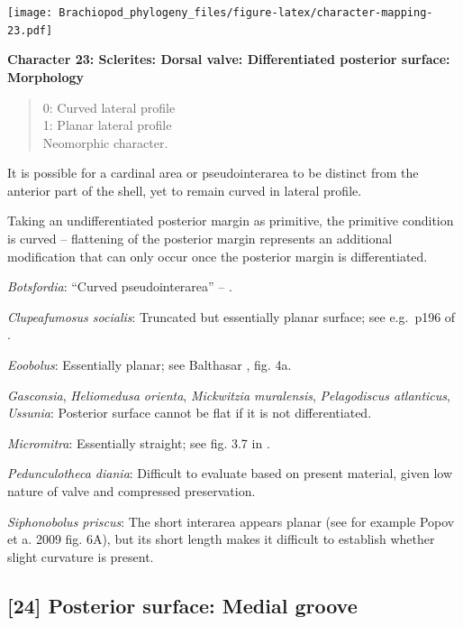 \documentclass[openany]{book}
\theoremstyle{definition}
\theoremstyle{definition}
\theoremstyle{definition}
\theoremstyle{remark}
\begin{document}
\texttt{[image: Brachiopod\_phylogeny\_files/figure-latex/character-mapping-23.pdf]}

\textbf{Character 23: Sclerites: Dorsal valve: Differentiated posterior
surface: Morphology}

\begin{quote}
0: Curved lateral profile\\
1: Planar lateral profile\\
Neomorphic character.
\end{quote}

It is possible for a cardinal area or pseudointerarea to be distinct
from the anterior part of the shell, yet to remain curved in lateral
profile.

Taking an undifferentiated posterior margin as primitive, the primitive
condition is curved -- flattening of the posterior margin represents an
additional modification that can only occur once the posterior margin is
differentiated.

\hypertarget{Botsfordia-coding-23}{}
\emph{Botsfordia}: ``Curved pseudointerarea'' --
\citet{Skovsted2017Depthrelated}.

\hypertarget{Clupeafumosus_socialis-coding-23}{}
\emph{Clupeafumosus socialis}: Truncated but essentially planar surface;
see e.g.~p196 of \citet{Topper2013Reappraisalof}.

\hypertarget{Eoobolus-coding-23}{}
\emph{Eoobolus}: Essentially planar; see Balthasar
\citeyearpar{Balthasar2009Thebrachiopod}, fig. 4a.

\hypertarget{Gasconsia-coding-23}{}
\emph{Gasconsia}, \emph{Heliomedusa orienta}, \emph{Mickwitzia
muralensis}, \emph{Pelagodiscus atlanticus}, \emph{Ussunia}: Posterior
surface cannot be flat if it is not differentiated.

\hypertarget{Micromitra-coding-23}{}
\emph{Micromitra}: Essentially straight; see fig. 3.7 in
\citet{Ushatinskaya2016Protegulumand}.

\hypertarget{Pedunculotheca_diania-coding-23}{}
\emph{Pedunculotheca diania}: Difficult to evaluate based on present
material, given low nature of valve and compressed preservation.

\hypertarget{Siphonobolus_priscus-coding-23}{}
\emph{Siphonobolus priscus}: The short interarea appears planar (see for
example Popov et a. 2009 fig. 6A), but its short length makes it
difficult to establish whether slight curvature is present.

\subsection*{{[}24{]} Posterior surface: Medial
groove}\label{posterior-surface-medial-groove}
\end{document}

